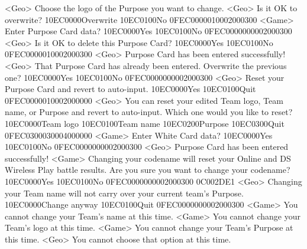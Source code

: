 <Geo> Choose the logo of the Purpose you want to change.
<Geo> Is it OK to overwrite? {10}{EC}{00}{00}Overwrite {10}{EC}{01}{00}No {0F}{EC}{00}{00}{01}{00}{02}{00}{03}{00}
<Game> Enter Purpose Card data? {10}{EC}{00}{00}Yes {10}{EC}{01}{00}No {0F}{EC}{00}{00}{00}{00}{02}{00}{03}{00}
<Geo> Is it OK to delete this Purpose Card? {10}{EC}{00}{00}Yes {10}{EC}{01}{00}No {0F}{EC}{00}{00}{01}{00}{02}{00}{03}{00}
<Geo> Purpose Card has been entered successfully! 
<Geo> That Purpose Card has already been entered. 
Overwrite the previous one? {10}{EC}{00}{00}Yes {10}{EC}{01}{00}No {0F}{EC}{00}{00}{00}{00}{02}{00}{03}{00}
<Geo> Reset your Purpose Card and revert to auto-input. {10}{EC}{00}{00}Yes {10}{EC}{01}{00}Quit {0F}{EC}{00}{00}{01}{00}{02}{00}{00}{00}
<Geo> You can reset your edited Team logo, Team name, or Purpose and revert to 
auto-input. Which one would you like to reset? {10}{EC}{00}{00}Team logo {10}{EC}{01}{00}Team name {10}{EC}{02}{00}Purpose {10}{EC}{03}{00}Quit {0F}{EC}{03}{00}{03}{00}{04}{00}{00}{00}
<Game> Enter White Card data? {10}{EC}{00}{00}Yes {10}{EC}{01}{00}No {0F}{EC}{00}{00}{00}{00}{02}{00}{03}{00}
<Geo> Purpose Card has been entered successfully! 
<Game> Changing your codename will reset your Online and DS Wireless Play battle results. 
Are you sure you want to change your codename? {10}{EC}{00}{00}Yes {10}{EC}{01}{00}No {0F}{EC}{00}{00}{00}{00}{02}{00}{03}{00}
{0C}{00}{2D}{E1} 
<Geo> Changing your Team name will not carry over your current team's Purpose. {10}{EC}{00}{00}Change anyway {10}{EC}{01}{00}Quit {0F}{EC}{00}{00}{00}{00}{02}{00}{03}{00}
<Game> You cannot change your Team's name at this time. 
<Game> You cannot change your Team's logo at this time. 
<Game> You cannot change your Team's Purpose at this time. 
<Geo> You cannot choose that option at this time. 
